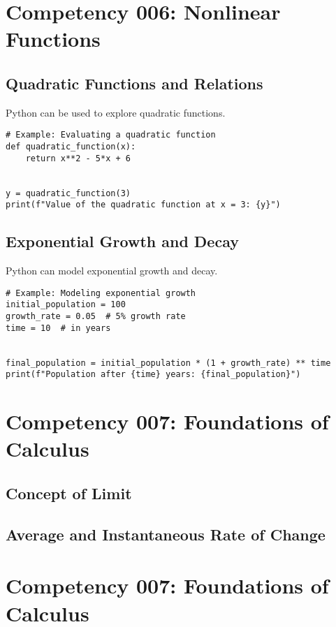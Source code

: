 \documentclass{book}
\begin{document}
\section{Competency 006: Nonlinear Functions}
\subsection{Quadratic Functions and Relations}
Python can be used to explore quadratic functions.


\begin{lstlisting}[style=pythonstyle]
# Example: Evaluating a quadratic function
def quadratic_function(x):
    return x**2 - 5*x + 6


y = quadratic_function(3)
print(f"Value of the quadratic function at x = 3: {y}")
\end{lstlisting}


\subsection{Exponential Growth and Decay}
Python can model exponential growth and decay.


\begin{lstlisting}[style=pythonstyle]
# Example: Modeling exponential growth
initial_population = 100
growth_rate = 0.05  # 5% growth rate
time = 10  # in years


final_population = initial_population * (1 + growth_rate) ** time
print(f"Population after {time} years: {final_population}")
\end{lstlisting}



\section{Competency 007: Foundations of Calculus}
\subsection{Concept of Limit}
\subsection{Average and Instantaneous Rate of Change}


\section{Competency 007: Foundations of Calculus}
\end{document}
